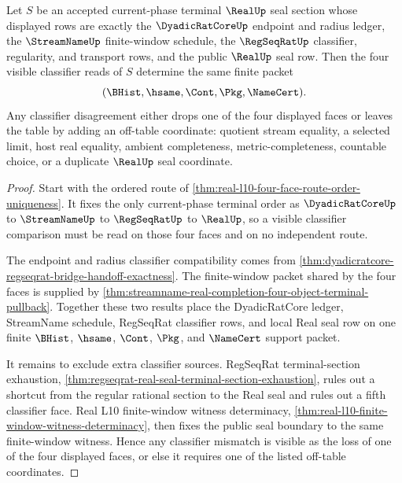 \begin{theorem}
\label{thm:real-l10-four-face-classifier-coherence}
Let $S$ be an accepted current-phase terminal $\RealUp$ seal section whose displayed rows are exactly the $\DyadicRatCoreUp$ endpoint and radius ledger, the $\StreamNameUp$ finite-window schedule, the $\RegSeqRatUp$ classifier, regularity, and transport rows, and the public $\RealUp$ seal row. Then the four visible classifier reads of $S$ determine the same finite packet
$$
(\BHist,\hsame,\Cont,\Pkg,\NameCert).
$$
Any classifier disagreement either drops one of the four displayed faces or leaves the table by adding an off-table coordinate: quotient stream equality, a selected limit, host real equality, ambient completeness, metric-completeness, countable choice, or a duplicate $\RealUp$ seal coordinate.
\end{theorem}
\begin{proof}
Start with the ordered route of \autoref{thm:real-l10-four-face-route-order-uniqueness}. It fixes the only current-phase terminal order as $\DyadicRatCoreUp$ to $\StreamNameUp$ to $\RegSeqRatUp$ to $\RealUp$, so a visible classifier comparison must be read on those four faces and on no independent route.

The endpoint and radius classifier compatibility comes from \autoref{thm:dyadicratcore-regseqrat-bridge-handoff-exactness}. The finite-window packet shared by the four faces is supplied by \autoref{thm:streamname-real-completion-four-object-terminal-pullback}. Together these two results place the DyadicRatCore ledger, StreamName schedule, RegSeqRat classifier rows, and local Real seal row on one finite $\BHist$, $\hsame$, $\Cont$, $\Pkg$, and $\NameCert$ support packet.

It remains to exclude extra classifier sources. RegSeqRat terminal-section exhaustion, \autoref{thm:regseqrat-real-seal-terminal-section-exhaustion}, rules out a shortcut from the regular rational section to the Real seal and rules out a fifth classifier face. Real L10 finite-window witness determinacy, \autoref{thm:real-l10-finite-window-witness-determinacy}, then fixes the public seal boundary to the same finite-window witness. Hence any classifier mismatch is visible as the loss of one of the four displayed faces, or else it requires one of the listed off-table coordinates.
\end{proof}

